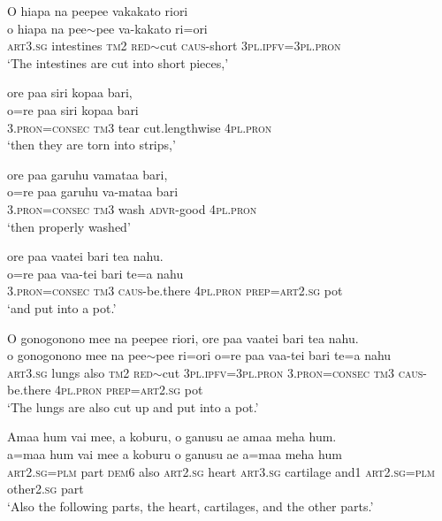 \ea\label{ex:text19-52}
O hiapa na peepee vakakato riori\\
\gll o	hiapa	na	pee{$\sim$}pee	va-kakato	ri=ori\\
     \textsc{art}3.\textsc{sg}	intestines	\textsc{tm}2	\textsc{red}{$\sim$}cut	\textsc{caus}-short	3\textsc{pl}.\textsc{ipfv}=3\textsc{pl}.\textsc{pron}\\
\glt `The intestines are cut into short pieces,'
\z

\ea\label{ex:text19-53}
ore paa siri kopaa bari,\\
\gll o=re	paa	siri	kopaa	bari\\
     3.\textsc{pron}=\textsc{consec}	\textsc{tm}3	tear	cut.lengthwise	4\textsc{pl}.\textsc{pron}\\
\glt `then they are torn into strips,'
\z

\ea\label{ex:text19-54}
ore paa garuhu vamataa bari,\\
\gll o=re	paa	garuhu	va-mataa	bari\\
     3.\textsc{pron}=\textsc{consec}	\textsc{tm}3	wash	\textsc{advr}-good	4\textsc{pl}.\textsc{pron}\\
\glt `then properly washed'
\z

\ea\label{ex:text19-55}
ore paa vaatei bari tea nahu.\\
\gll o=re	paa	vaa-tei	bari	te=a	nahu\\
     3.\textsc{pron}=\textsc{consec}	\textsc{tm}3	\textsc{caus}-be.there	4\textsc{pl}.\textsc{pron}	\textsc{prep}=\textsc{art}2.\textsc{sg}	pot\\
\glt `and put into a pot.'
\z

\ea\label{ex:text19-56}
O gonogonono mee na peepee riori, ore paa vaatei bari tea nahu.\\
\gll o	gonogonono	mee	na	pee{$\sim$}pee	ri=ori	o=re	paa	vaa-tei	bari	te=a	nahu\\
     \textsc{art}3.\textsc{sg}	lungs	also	\textsc{tm}2	\textsc{red}{$\sim$}cut	3\textsc{pl}.\textsc{ipfv}=3\textsc{pl}.\textsc{pron}	3.\textsc{pron}=\textsc{consec}	\textsc{tm}3	\textsc{caus}-be.there	4\textsc{pl}.\textsc{pron}	\textsc{prep}=\textsc{art}2.\textsc{sg}	pot\\
\glt `The lungs are also cut up and put into a pot.'
\z

\ea\label{ex:text19-57}
Amaa hum vai mee, a koburu, o ganusu ae amaa meha hum.\\
\gll a=maa	hum	vai	mee	a	koburu	o	ganusu	ae	a=maa	meha	hum\\
     \textsc{art}2.\textsc{sg}=\textsc{plm}	part	\textsc{dem}6	also	\textsc{art}2.\textsc{sg}	heart	\textsc{art}3.\textsc{sg}	cartilage	and1	\textsc{art}2.\textsc{sg}=\textsc{plm}	other2.\textsc{sg}	part\\
\glt `Also the following parts, the heart, cartilages, and the other parts.'
\z

